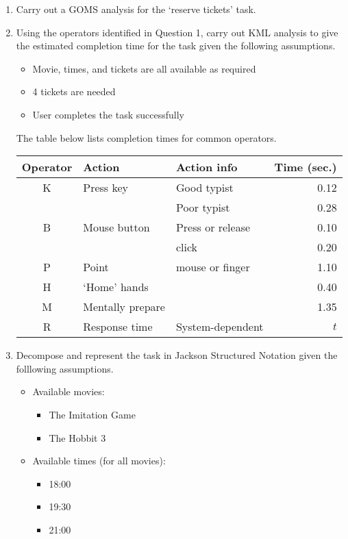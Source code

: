 \documentclass[11pt,a4paper]{report}
\begin{document}
\begin{enumerate}

\item Carry out a GOMS analysis for the `reserve tickets' task.

\item Using the operators identified in Question 1, carry out KML analysis to give the estimated completion time for the task given the following assumptions.
    \begin{itemize}
        \item Movie, times, and tickets are all available as required
        \item 4 tickets are needed
        \item User completes the task successfully      
    \end{itemize}

    The table below lists completion times for common operators.\\  
    \vskip10pt
    \begin{tabular}{| c | l | l | r |}
        \hline
        \textbf{Operator} & \textbf{Action} & \textbf{Action info} & \textbf{Time (sec.)}\\
        \hline
        \hline
        K & Press key & Good typist & 0.12\\
        & & Poor typist & 0.28\\
        \hline
        B & Mouse button & Press or release & 0.10\\
        & & click & 0.20\\
        \hline
        P & Point & mouse or finger & 1.10\\
        \hline
        H & `Home' hands &  & 0.40\\
        \hline
        M & Mentally prepare & & 1.35\\
        \hline
        R & Response time & System-dependent & $t$\\
        \hline 
    \end{tabular}

\item Decompose and represent the task in Jackson Structured Notation given the folllowing assumptions.
    \begin{itemize}
        \item Available movies:
            \begin{itemize}
                \item The Imitation Game
                \item The Hobbit 3  
            \end{itemize}
        \item Available times (for all movies):
            \begin{itemize}
                \item 18:00
                \item 19:30
                \item 21:00
            \end{itemize}
    \end{itemize}   

\end{enumerate}
\end{document}
